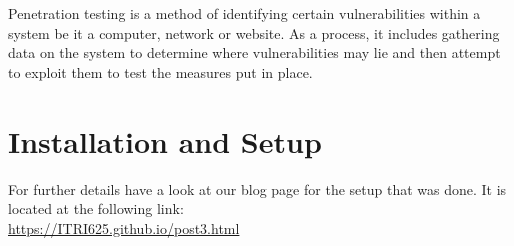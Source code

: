 \documentclass[a4paper, 12pt, titlepage]{report}
\begin{document}
Penetration testing is a method of identifying certain vulnerabilities within a system be it a computer, network or website. As a process, it includes gathering data on the system to determine where vulnerabilities may lie and then attempt to exploit them to test the measures put in place.\cite{goodDef}



\chapter{Installation and Setup}
For further details have a look at our blog page for the setup that was done. It is located at the following link:\\
\url{https://ITRI625.github.io/post3.html}
\end{document}
